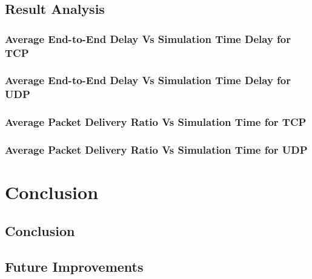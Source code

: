 \documentclass[11pt,a4paper]{report}
\begin{document}
\section{Result Analysis}
\subsection{Average End-to-End Delay Vs Simulation Time Delay for TCP}
\subsection{Average End-to-End Delay Vs Simulation Time Delay for UDP}
\subsection{Average Packet Delivery Ratio Vs Simulation Time for TCP}
\subsection{Average Packet Delivery Ratio Vs Simulation Time for UDP}

\chapter{Conclusion}
\section{Conclusion}
\section{Future Improvements}
\end{document}
